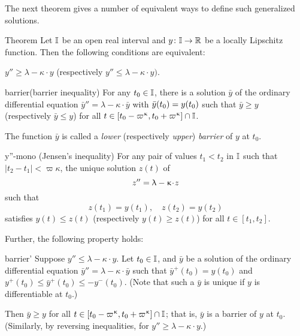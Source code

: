 The next theorem gives a  number of equivalent ways to define such  generalized solutions.

\begin{thm}{Theorem}\label{y''=<1-ky}
Let $\mathbb{I}$ be an open real interval and $y\:\II\to\RR$ be a locally Lipschitz function.
Then the following conditions are equivalent:
\begin{subthm}{}$y''\ge \lambda-\kappa\cdot  y$ (respectively $y''\le \lambda-\kappa\cdot  y).$
\end{subthm}

\begin{subthm}{barrier}(barrier inequality) For any $t_0\in \II$, 
there is a solution $\bar y$ 
of the ordinary differential equation $\bar y''=\lambda-\kappa\cdot  \bar y$ 
with $\bar y(t_0)\z= y(t_0)$ such that $\bar y\ge y$ (respectively $\bar y\le y$) for all $t\in [t_0-\varpi\kappa,t_0+\varpi\kappa]\cap \II$.

The function $\bar y$ is called a {}\emph{lower} (respectively {}\emph{upper}) \emph{barrier} of $y$ at $t_0$.
\end{subthm}



\begin{subthm}{y''-mono} (Jensen's inequality)
For any pair of values $t_1<t_2$ in $\mathbb{I}$ such that $|t_2-t_1|<\varpi\kappa$,  the unique solution $z(t)$ of \[z''\z=\lambda-\kappa\cdot  z\] such that
\[z(t_1)=y(t_1),\quad z(t_2)=y(t_2)\] 
satisfies $y(t)\le z(t)$ (respectively $y(t)\ge z(t)$) for all $t\in[t_1,t_2]$.
\end{subthm}

Further, the following property holds:

\begin{subthm}{barrier'} 
Suppose $y''\le \lambda-\kappa\cdot  y$. Let $t_0\in\II$, and   $\bar y$ be a solution of  the
 ordinary differential equation $\bar y''=\lambda-\kappa\cdot  \bar y$ 
such that  $\bar y^+(t_0)= y(t_0)$ and 
$y^+(t_0)\le \bar y^+(t_0)\le -y^-(t_0)$.
(Note that such a $\bar{y}$ is unique if $y$ is differentiable at $t_0$.) 

Then $\bar y\ge y$  for all $t\in [t_0-\varpi\kappa,t_0+\varpi\kappa]\cap \II$; that is, $\bar{y}$ is a barrier of $y$ at $t_0$. (Similarly, by reversing inequalities, for $y''\ge \lambda-\kappa\cdot  y$.) 
\end{subthm}
\end{thm}

